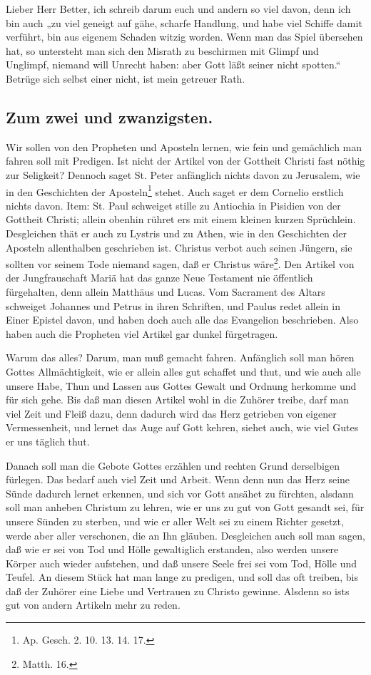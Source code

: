 Lieber Herr Better, ich schreib darum euch und andern so viel davon, denn ich bin auch „zu viel geneigt auf gähe, scharfe Handlung, und habe viel Schiffe damit verführt, bin aus eigenem Schaden witzig worden. Wenn man das Spiel übersehen hat, so untersteht man sich den Misrath zu beschirmen mit Glimpf und Unglimpf, niemand will Unrecht haben: aber Gott läßt seiner nicht spotten.“ Betrüge sich selbst einer nicht, ist mein getreuer Rath.

\subsection*{Zum zwei und zwanzigsten.}

Wir sollen von den Propheten und Aposteln lernen, wie fein und gemächlich man fahren soll mit Predigen. Ist nicht der Artikel von der Gottheit Christi fast nöthig zur Seligkeit? Dennoch saget St. Peter anfänglich nichts davon zu Jerusalem, wie in den Geschichten der Aposteln\footnote{Ap. Gesch. 2. 10. 13. 14. 17.} stehet. Auch saget er dem Cornelio erstlich nichts davon. Item: St. Paul schweiget stille zu Antiochia in Pisidien von der Gottheit Christi; allein obenhin rühret ers mit einem kleinen kurzen Sprüchlein. Desgleichen thät er auch zu Lystris und zu Athen, wie in den Geschichten der Aposteln allenthalben geschrieben ist. Christus verbot auch seinen Jüngern, sie sollten vor seinem Tode niemand sagen, daß er Christus wäre\footnote{Matth. 16.}. Den Artikel von der Jungfrauschaft Mariä hat das ganze Neue Testament nie öffentlich fürgehalten, denn allein Matthäus und Lucas. Vom Sacrament des Altars schweiget Johannes und Petrus in ihren Schriften, und Paulus redet allein in Einer Epistel davon, und haben doch auch alle das Evangelion beschrieben. Also haben auch die Propheten viel Artikel gar dunkel fürgetragen.

Warum das alles? Darum, man muß gemacht fahren. Anfänglich soll man hören Gottes Allmächtigkeit, wie er allein alles gut schaffet und thut, und wie auch alle unsere Habe, Thun und Lassen aus Gottes Gewalt und Ordnung herkomme und für sich gehe. Bis daß man diesen Artikel wohl in die Zuhörer treibe, darf man viel Zeit und Fleiß dazu, denn dadurch wird das Herz getrieben von eigener Vermessenheit, und lernet das Auge auf Gott kehren, siehet auch, wie viel Gutes er uns täglich thut.

Danach soll man die Gebote Gottes erzählen und rechten Grund derselbigen fürlegen. Das bedarf auch viel Zeit und Arbeit. Wenn denn nun das Herz seine Sünde dadurch lernet erkennen, und sich vor Gott ansähet zu fürchten, alsdann soll man anheben Christum zu lehren, wie er uns zu gut von Gott gesandt sei, für unsere Sünden zu sterben, und wie er aller Welt sei zu einem Richter gesetzt, werde aber aller verschonen, die an Ihn gläuben. Desgleichen auch soll man sagen, daß wie er sei von Tod und Hölle gewaltiglich erstanden, also werden unsere Körper auch wieder aufstehen, und daß unsere Seele frei sei vom Tod, Hölle und Teufel. An diesem Stück hat man lange zu predigen, und soll das oft treiben, bis daß der Zuhörer eine Liebe und Vertrauen zu Christo gewinne. Alsdenn so ists gut von andern Artikeln mehr zu reden.

